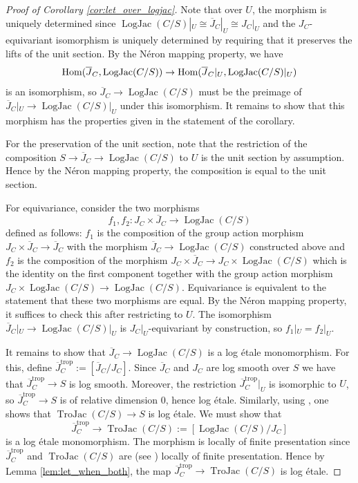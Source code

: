 \documentclass[11pt]{amsart}
\theoremstyle{definition}
\theoremstyle{remark}
\DeclareMathOperator{\LogJac}{LogJac}
\def\trop{\mathrm{trop}}
\DeclareMathOperator{\TroJac}{TroJac}
\DeclareMathOperator{\Hom}{\textup{Hom}}
\begin{document}
\begin{proof}[Proof of Corollary \ref{cor:let_over_logjac}]
	Note that over $U$, the morphism is uniquely determined
	since $\LogJac(C/S)|_U\cong \overline{J}_C|_U\cong J_C|_U$ and the $J_C$-equivariant isomorphism is uniquely
	determined by requiring that it preserves the lifts of the unit section. By the Néron mapping property,
	we have
	$$\Hom(\overline{J}_C,\LogJac(C/S))\to \Hom(\overline{J}_C|_U,\LogJac(C/S)|_U)$$
	is an isomorphism, so $\overline{J}_C\to \LogJac(C/S)$ must be the preimage of $\overline{J}_C|_U\to \LogJac(C/S)|_U$
	under this isomorphism. It remains to show that this morphism has the properties given in the statement of the corollary.

	For the preservation of the unit section, note that the restriction of the composition $S\to \overline{J}_C\to \LogJac(C/S)$
	to $U$ is the unit section by assumption. Hence by the Néron mapping property, the composition is equal to the unit section.

	For equivariance, consider the
	two morphisms
	$$f_1,f_2:J_C\times \overline{J}_C\to \LogJac(C/S)$$
	defined as follows:
	$f_1$ is the composition of the group action morphism $J_C\times \overline{J}_C\to \overline{J}_C$
	with the morphism $\overline{J}_C\to \LogJac(C/S)$ constructed above and $f_2$ is the
	composition of the morphism $J_C\times \overline{J}_C\to J_C\times\LogJac(C/S)$ which is
	the identity on the first component together with the group action morphism $J_C\times \LogJac(C/S)\to \LogJac(C/S)$.
	Equivariance is equivalent to the statement that these two morphisms are equal. By the Néron mapping property,
	it suffices to check this after restricting to $U$. The isomorphism $\overline{J}_C|_U\to \LogJac(C/S)|_U$
	is $J_C|_U$-equivariant by construction, so $f_1|_U=f_2|_U$.

	It remains to show that
	$\overline{J}_C\to \LogJac(C/S)$ is a log étale monomorphism. For this, define
	$\overline{J}_C^{\trop}:=[\overline{J}_C/J_C]$. Since $\overline{J}_C$ and $J_C$ are
	log smooth over $S$ we have that $\overline{J}_C^{\trop}\to S$ is log smooth. Moreover,
	the restriction $\overline{J}_C^{\trop}|_U$ is isomorphic to $U$, so $\overline{J}_C^{\trop}\to S$
	is of relative dimension 0, hence log étale. Similarly, using \cite[Corollary 4.11.4]{TheLogarithmicMolcho2022},
	one shows that $\TroJac(C/S)\to S$ is log étale.
	We must show that
	$$\overline{J}_C^{\trop}\to \TroJac(C/S):=[\LogJac(C/S)/J_C]$$
	is a
	log étale monomorphism. The morphism is locally of finite
	presentation since $\overline{J}_C^{\trop}$
	and $\TroJac(C/S)$ are (see \cite[Corollary 4.2.3]{TheLogarithmicMolcho2022}) locally of finite presentation.
	Hence by Lemma \ref{lem:let_when_both}, the map $\overline{J}_C^{\trop}\to \TroJac(C/S)$
	is log étale.


\end{proof}
\end{document}
